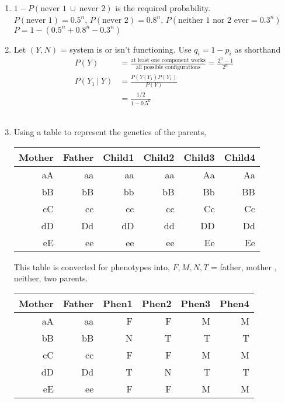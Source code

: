 \begin{enumerate}
	\item $ 1 - P( \text{never 1}\  \cup\  \text{never 2}) $ is the required probability. \\
	$ P(\text{never 1}) = 0.5^n $, $ P(\text{never 2}) = 0.8^n $, $P(\text{neither 1 nor 2 ever} = 0.3^n)$ \\
	$ P = 1 - (0.5^n + 0.8^n - 0.3^n) $\\
	
	\item Let $ (Y, N) $ = system is or isn't functioning.  Use $ q_i = 1 - p_i $ as shorthand\\
	
		\begin{align}
			P(Y) &= \frac{\text{at least one component works}}{\text{all possible configurations}} = \frac{2^n - 1}{2^n} \\
			P(Y_1\ |\ Y) &= \frac{P(Y\ |\ Y_1) P(Y_1)}{P(Y)} \\
			&= \frac{1/2}{1 - 0.5^n}
		\end{align} \\
	
	
	\item 	Using a table to represent the genetics of the parents, 
	\begin{table}[H]
		\centering
		\begin{tabular}{@{}rr|rrrr@{}}
			\toprule
			Mother & Father & Child1 & Child2 & Child3 & Child4 \\ \midrule
			aA     & aa		& aa	 & aa 	  & Aa 	   & Aa   \\
			bB     & bB     & bb	 & bB 	  & Bb 	   & BB    \\
			cC     & cc     & cc	 & cc 	  & Cc 	   & Cc    \\
			dD     & Dd     & dD	 & dd 	  & DD 	   & Dd    \\
			eE     & ee     & ee	 & ee 	  & Ee 	   & Ee    \\ \bottomrule
		\end{tabular}
	\end{table}
	
	This table is converted for phenotypes into, $ F, M, N, T $ = father, mother , neither, two parents.\\
	
	\begin{table}[H]
		\centering
		\begin{tabular}{@{}rr|rrrr@{}}
			\toprule
			Mother & Father & Phen1 & Phen2 & Phen3 & Phen4 \\ \midrule
			aA     & aa		& F	 & F 	  & M 	   & M   \\
			bB     & bB     & N	 & T 	  & T 	   & T    \\
			cC     & cc     & F	 & F 	  & M 	   & M    \\
			dD     & Dd     & T	 & N 	  & T 	   & T    \\
			eE     & ee     & F	 & F 	  & M 	   & M    \\ \bottomrule
		\end{tabular}
	\end{table}
	

\end{enumerate}
